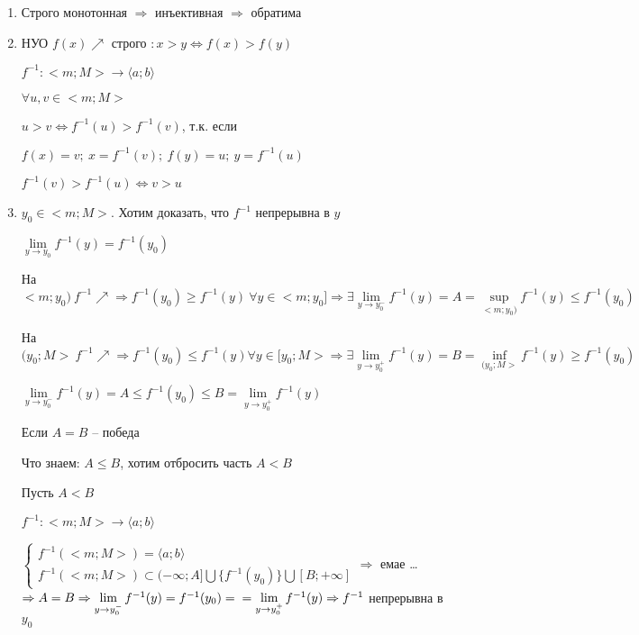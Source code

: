 \documentclass[14pt, letter paper]{article}
\newcommand{\q}[1]{\langle #1 \rangle}
\begin{document}
\begin{enumerate}
    \item Строго монотонная $\Rightarrow$ инъективная $\Rightarrow$ обратима

    \item НУО $f(x) \nearrow$ строго $: x > y \Leftrightarrow f(x) > f(y)$

    $f^{-1} : <m;M> \rightarrow \q{a; b}$

    $\forall u, v \in <m;M>$

    $u > v \Leftrightarrow f^{-1}(u) > f^{-1}(v)$, т.к. если

    $f(x) = v;\ x = f^{-1}(v);\ f(y) = u;\ y = f^{-1}(u)$

    $f^{-1}(v) > f^{-1}(u) \Leftrightarrow v > u$

    \item $y_0 \in <m;M>$. Хотим доказать, что $f^{-1}$ непрерывна в $y$

    $\lim\limits_{y \rightarrow y_0}{f^{-1}(y)} = f^{-1}(y_0)$

    На $<m;y_0)\ f^{-1} \nearrow \Rightarrow f^{-1}(y_0) \geq f^{-1}(y)\ \forall y \in <m; y_0] \Rightarrow \exists \lim\limits_{y \rightarrow y_0^-}{f^{-1}(y)} = A = \sup\limits_{<m;y_0)}f^{-1}(y) \leq f^{-1}(y_0)$

    На $(y_0;M>\ f^{-1} \nearrow \Rightarrow f^{-1}(y_0) \leq f^{-1}(y) \forall y \in [y_0;M> \Rightarrow \exists \lim\limits_{y \rightarrow y_0^+}{f^{-1}(y)} = B = \inf\limits_{(y_0;M>}{f^{-1}(y)} \geq f^{-1}(y_0)$

    $\lim\limits_{y \rightarrow y_0^-}{f^{-1}(y)} = A \leq f^{-1}(y_0) \leq B = \lim\limits_{y \rightarrow y_0^+}{f^{-1}(y)}$

    Если $A = B$ -- победа

    Что знаем: $A \leq B$, хотим отбросить часть $A < B$

    Пусть $A < B$

    $f^{-1} : <m;M> \rightarrow \q{a; b}$

    $\begin{cases}
        f^{-1}(<m;M>) = \q{a; b} \\
        f^{-1}(<m;M>) \subset (- \infty; A] \bigcup \{f^{-1}(y_0)\} \bigcup [B; + \infty]
    \end{cases} \Rightarrow$ емае \ldots $\Rightarrow A = B \Rightarrow \lim\limits_{y \rightarrow y_0^-}{f^{-1}(y)} = f^{-1}(y_0) = \\ = \lim\limits_{y \rightarrow y_0^+}{f^{-1}(y)} \Rightarrow f^{-1}$ непрерывна в $y_0$
\end{enumerate}
\end{document}
